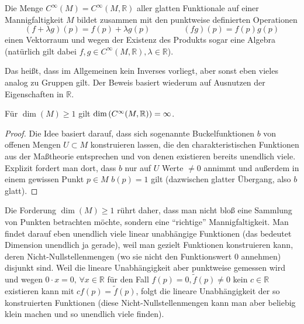 \documentclass[../H_Analysis_main.tex]{subfiles}
\begin{document}
\begin{cor}[Funktionenraum]
Die Menge $C^\infty(M) = C^\infty(M, \mathbb{R})$ aller glatten Funktionale auf einer Mannigfaltigkeit $M$ bildet zusammen mit den punktweise definierten Operationen
\begin{equation}
(f + \lambda g)(p) = f(p) + \lambda g(p) \qquad \qquad (fg)(p) = f(p) g(p)
\end{equation}
einen Vektorraum und wegen der Existenz des Produkts sogar eine Algebra (natürlich gilt dabei $f, g \in C^\infty(M, \mathbb{R}), \lambda \in \mathbb{R}$).
\end{cor}
Das heißt, dass im Allgemeinen kein Inverses vorliegt, aber sonst eben vieles analog zu Gruppen gilt. Der Beweis basiert wiederum auf Ausnutzen der Eigenschaften in $\mathbb{R}$.


\begin{cor}\label{cor:dimcinfty}
Für $\dim(M) \geq 1$ gilt $\dim\qty(C^\infty(M, \mathbb{R})) = \infty$.
\end{cor}

\begin{proof}
Die Idee basiert darauf, dass sich sogenannte Buckelfunktionen $b$ von offenen Mengen $U \subset M$ konstruieren lassen, die den charakteristischen Funktionen aus der Maßtheorie entsprechen und von denen existieren bereits unendlich viele. Explizit fordert man dort, dass $b$ nur auf $U$ Werte $\neq 0$ annimmt und außerdem in einem gewissen Punkt $p \in M$ $b(p) = 1$ gilt (dazwischen glatter Übergang, also $b$ glatt).
\end{proof}
Die Forderung $\dim(M) \geq 1$ rührt daher, dass man nicht bloß eine Sammlung von Punkten betrachten möchte, sondern eine \enquote{richtige} Mannigfaltigkeit. Man findet darauf eben unendlich viele linear unabhängige Funktionen (das bedeutet Dimension unendlich ja gerade), weil man gezielt Funktionen konstruieren kann, deren Nicht-Nullstellenmengen (wo sie nicht den Funktionswert 0 annehmen) disjunkt sind. Weil die lineare Unabhängigkeit aber punktweise gemessen wird und wegen $0 \cdot x = 0, \, \forall x \in \mathbb{R}$ für den Fall $f(p) = 0, \tilde{f}(p) \neq 0$ kein $c \in \mathbb{R}$ existieren kann mit $c f(p) = \tilde{f}(p)$, folgt die lineare Unabhängigkeit der so konstruierten Funktionen (diese Nicht-Nullstellenmengen kann man aber beliebig klein machen und so unendlich viele finden).
\end{document}
